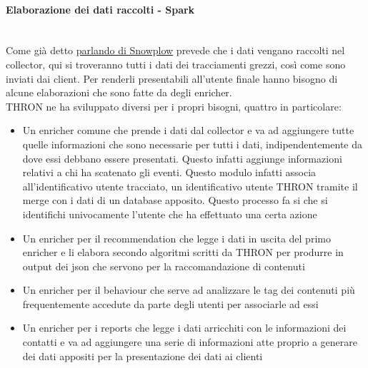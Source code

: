\documentclass[a4paper, 12pt, twoside, openright]{book}
\begin{document}
\paragraph{Elaborazione dei dati raccolti - Spark}\mbox{} \\
Come già detto \hyperref[snowplow]{parlando di Snowplow} prevede che i dati vengano raccolti nel collector, qui si troveranno tutti i dati dei tracciamenti grezzi, così come sono inviati dai client. Per renderli presentabili all'utente finale hanno bisogno di alcune elaborazioni che sono fatte da degli enricher.\\
THRON ne ha sviluppato diversi per i propri bisogni, quattro in particolare:
\begin{itemize}
	\item Un enricher comune che prende i dati dal collector e va ad aggiungere tutte quelle informazioni che sono necessarie per tutti i dati, indipendentemente da dove essi debbano essere presentati. Questo infatti aggiunge informazioni relativi a chi ha scatenato gli eventi. Questo modulo infatti associa all'identificativo utente tracciato, un identificativo utente THRON tramite il merge con i dati di un database apposito. Questo processo fa si che si identifichi univocamente l'utente che ha effettuato una certa azione
	\item Un enricher per il recommendation che legge i dati in uscita del primo enricher e li elabora secondo algoritmi scritti da THRON per produrre in output dei json che servono per la raccomandazione di contenuti
	\item Un enricher per il behaviour che serve ad analizzare le tag dei contenuti più frequentemente accedute da parte degli utenti per associarle ad essi
	\item Un enricher per i reports che legge i dati arricchiti con le informazioni dei contatti e va ad aggiungere una serie di informazioni atte proprio a generare dei dati appositi per la presentazione dei dati ai clienti 
\end{itemize}
\end{document}
